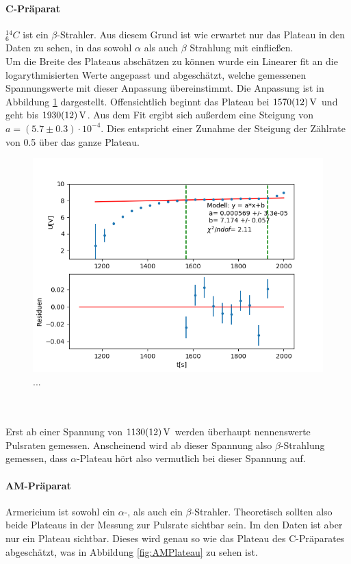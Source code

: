 \documentclass[12pt,a4paper]{article}
\begin{document}
\paragraph{C-Präparat}
$_6^{14} C$ ist ein $\beta$-Strahler. Aus diesem Grund ist wie erwartet nur das Plateau in den Daten zu sehen, in das sowohl $\alpha$ als auch $\beta$ Strahlung mit einfließen.\\
Um die Breite des Plateaus abschätzen zu können wurde ein Linearer fit an die logarythmisierten Werte angepasst und abgeschätzt, welche gemessenen Spannungswerte  mit dieser Anpassung übereinstimmt. Die Anpassung ist in Abbildung \ref{fig:CPlateau} dargestellt. Offensichtlich beginnt das Plateau bei $\SI{1570\pm 12}{V}$ und geht bis $\SI{1930\pm 12}{V}$. Aus dem Fit ergibt sich außerdem eine Steigung von $a = (5.7\pm0.3)\cdot 10^{-4}$. Dies entspricht einer Zunahme der Steigung der Zählrate von 0.5 über das ganze Plateau.
\begin{figure}
\centering
\includegraphics[scale=0.8]{Bilder/Prop/C_plateau.PNG}
\caption{...}
\label{fig:CPlateau}
\end{figure}\\
\\
Erst ab einer Spannung von $\SI{1130\pm 12}{V}$ werden überhaupt nennenswerte Pulsraten gemessen. Anscheinend wird ab dieser Spannung also $\beta$-Strahlung gemessen, dass $\alpha$-Plateau hört also vermutlich bei dieser Spannung auf.

\paragraph{AM-Präparat}
Armericium ist sowohl ein $\alpha$-, als auch ein $\beta$-Strahler. Theoretisch sollten also beide Plateaus in der Messung zur Pulsrate sichtbar sein. Im den Daten ist aber nur ein Plateau sichtbar. Dieses wird genau so wie das Plateau des C-Präparates abgeschätzt, was in Abbildung \ref{fig:AMPlateau} zu sehen ist.
\end{document}
